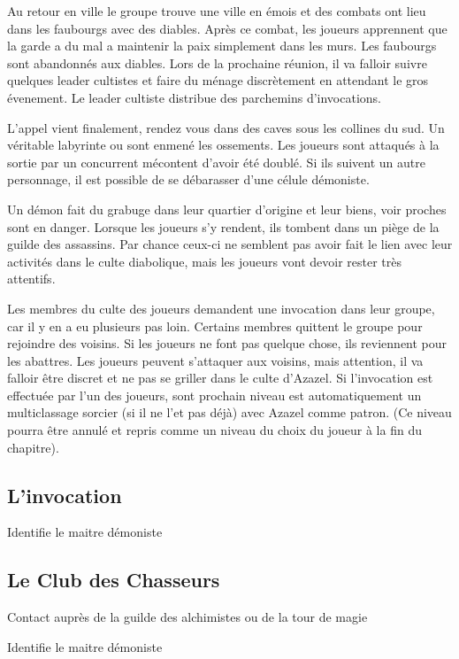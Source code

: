 Au retour en ville le groupe trouve une ville en émois et des combats ont 
lieu dans les faubourgs avec des diables. Après ce combat, les joueurs apprennent
que la garde a du mal a maintenir la paix simplement dans les murs. Les faubourgs 
sont abandonnés aux diables. Lors de la prochaine réunion, il va falloir suivre
quelques leader cultistes et faire du ménage discrètement en attendant le gros 
évenement. Le leader cultiste distribue des parchemins d'invocations.

L'appel vient finalement, rendez vous dans des caves sous les collines du sud.
Un véritable labyrinte ou sont enmené les ossements. Les joueurs sont attaqués
à la sortie par un concurrent mécontent d'avoir été doublé. Si ils suivent un 
autre personnage, il est possible de se débarasser d'une célule démoniste.

Un démon fait du grabuge dans leur quartier d'origine et 
leur biens, voir proches sont en danger. Lorsque les joueurs s'y rendent, ils tombent 
dans un piège de la guilde des assassins. Par chance ceux-ci ne semblent pas avoir 
fait le lien avec leur activités dans le culte diabolique, mais les joueurs vont
devoir rester très attentifs.

Les membres du culte des joueurs demandent une invocation dans leur groupe, car il y
en a eu plusieurs pas loin. Certains membres quittent le groupe pour rejoindre
des voisins. Si les joueurs ne font pas quelque chose, ils reviennent pour les
abattres. Les joueurs peuvent s'attaquer aux voisins, mais attention, il va falloir 
être discret et ne pas se griller dans le culte d'Azazel. Si l'invocation est 
effectuée par l'un des joueurs, sont prochain niveau est automatiquement un 
multiclassage sorcier (si il ne l'et pas déjà) avec Azazel comme patron. (Ce niveau 
pourra être annulé et repris comme un niveau du choix du joueur à la fin du chapitre).

\subsection*{L'invocation}


Identifie le maitre démoniste

\subsection*{Le Club des Chasseurs}

Contact auprès de la guilde des alchimistes ou de la tour de magie


Identifie le maitre démoniste
